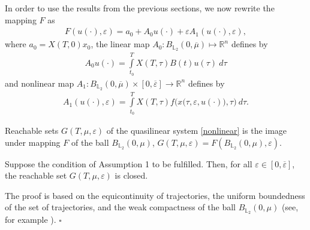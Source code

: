 \documentclass[../main.tex]{subfiles}
\begin{document}
In order to use the results from the previous sections, we now rewrite the mapping $F$ as
\begin{gather*}
	F(u(\cdot),\varepsilon) = a_0 + A_0 u(\cdot) + \varepsilon A_1(u(\cdot), \varepsilon), 
\end{gather*}
where $a_0 = X(T,0)x_0 $, the linear map $A_0: B_{\mathbb{L}_2}(0,\overline{\mu})  \mapsto \mathbb{R}^n$ defines by 
\begin{gather*}
	A_0 u(\cdot) = \int\limits_{t_0}^T X(T,\tau) B(t)u(\tau)\ d\tau
\end{gather*}
and nonlinear map $A_1: B_{\mathbb{L}_2}(0,\overline{\mu}) \times [0,\overline{\varepsilon}] \to \mathbb{R}^n$ defines by 
\begin{gather}\label{A1_def}
	A_1(u(\cdot),\varepsilon) = \int\limits_{t_0}^T X(T,\tau) f\Big(x\big(\tau,\varepsilon, u(\cdot)\big),\tau\Big) \ d\tau.
\end{gather}

Reachable sets $G(T,\mu,\varepsilon) $ of the quasilinear system \eqref{nonlinear} is the image under mapping $F$ of the ball $B_{\mathbb{L}_2}(0,\mu)$, $G(T,\mu,\varepsilon) = F(B_{\mathbb{L}_2}(0,\mu),\varepsilon)$.

\begin{utv}\label{ReachableSetcloseness}
	Suppose the condition of Assumption 1 to be fulfilled. Then, for all $\varepsilon\in [0,\overline{\varepsilon}]$, the reachable set $G(T,\mu,\varepsilon) $ is closed.
\end{utv}
\doc
The proof is based on the equicontinuity of trajectories, the uniform boundedness of the set of trajectories, and the weak compactness of the ball $B_{\mathbb{L}_2}(0,\mu)$ (see, for example \cite{GusZyk}).
\hfill$\square$\\[1ex]%
\end{document}
